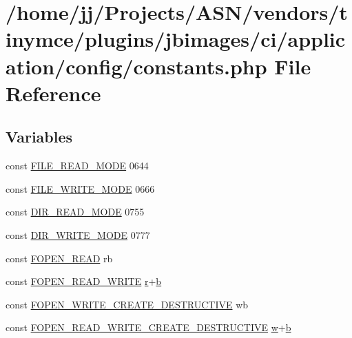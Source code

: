 \hypertarget{constants_8php}{}\section{/home/jj/\+Projects/\+A\+S\+N/vendors/tinymce/plugins/jbimages/ci/application/config/constants.php File Reference}
\label{constants_8php}
\subsection*{Variables}
\begin{DoxyCompactItemize}
\item 
const \hyperlink{constants_8php_afa80a675a7a8436c2b299e41c63fd405}{F\+I\+L\+E\+\_\+\+R\+E\+A\+D\+\_\+\+M\+O\+DE} 0644
\item 
const \hyperlink{constants_8php_a6b9fcdc9259bf9361e8f97e289024242}{F\+I\+L\+E\+\_\+\+W\+R\+I\+T\+E\+\_\+\+M\+O\+DE} 0666
\item 
const \hyperlink{constants_8php_a5eb43292f0c56482a7869db8adb1c91d}{D\+I\+R\+\_\+\+R\+E\+A\+D\+\_\+\+M\+O\+DE} 0755
\item 
const \hyperlink{constants_8php_aac7345ea170768d48be7cde8ebf6b147}{D\+I\+R\+\_\+\+W\+R\+I\+T\+E\+\_\+\+M\+O\+DE} 0777
\item 
const \hyperlink{constants_8php_ab6a0a1c6e9ea5f7625b2dba2f7bd286c}{F\+O\+P\+E\+N\+\_\+\+R\+E\+AD} \textquotesingle{}rb\textquotesingle{}
\item 
const \hyperlink{constants_8php_ab98552969950ea978284c998e10d0153}{F\+O\+P\+E\+N\+\_\+\+R\+E\+A\+D\+\_\+\+W\+R\+I\+TE} \textquotesingle{}\hyperlink{jquery-1_811_81_8min_8js_a96f65b399314d93896076ceb474b6b9b}{r}+\hyperlink{bootstrap_8min_8js_a398bb8542498d1b14178b02b99df309b}{b}\textquotesingle{}
\item 
const \hyperlink{constants_8php_a246692af603ceac463cab532d81a6048}{F\+O\+P\+E\+N\+\_\+\+W\+R\+I\+T\+E\+\_\+\+C\+R\+E\+A\+T\+E\+\_\+\+D\+E\+S\+T\+R\+U\+C\+T\+I\+VE} \textquotesingle{}wb\textquotesingle{}
\item 
const \hyperlink{constants_8php_a1b8581dfce24061e847cc257aed23d62}{F\+O\+P\+E\+N\+\_\+\+R\+E\+A\+D\+\_\+\+W\+R\+I\+T\+E\+\_\+\+C\+R\+E\+A\+T\+E\+\_\+\+D\+E\+S\+T\+R\+U\+C\+T\+I\+VE} \textquotesingle{}\hyperlink{_chart_8min_8js_a9721a992655f700bdc2e91ba68b71e26}{w}+\hyperlink{bootstrap_8min_8js_a398bb8542498d1b14178b02b99df309b}{b}\textquotesingle{}

\end{DoxyCompactItemize}
